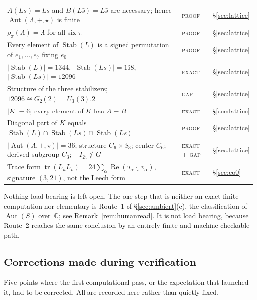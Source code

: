 \documentclass[11pt]{amsart}
\newcommand{\LL}{\Lambda}
\newcommand{\CC}{\mathbb{C}}
\DeclareMathOperator{\Aut}{Aut}
\DeclareMathOperator{\Stab}{Stab}
\DeclareMathOperator{\Tr}{tr}
\DeclareMathOperator{\Rea}{Re}
\theoremstyle{definition}
\theoremstyle{remark}
\begin{document}
\begin{center}
\begin{longtable}{p{}p{}p{}}
$A(Ls) = Ls$ and $B(L\bar s) = L\bar s$ are necessary; hence $\Aut(\LL,+,\star)$ is finite & \textsc{proof} & \S\ref{sec:lattice} \\
$\rho_\pi(\LL) = \LL$ for all six $\pi$ & \textsc{proof} & \S\ref{sec:lattice} \\
Every element of $\Stab(L)$ is a signed permutation of $e_1,\ldots,e_7$ fixing $e_0$ & \textsc{proof} & \S\ref{sec:lattice} \\
$|\Stab(L)| = 1344$, $|\Stab(Ls)| = 168$, $|\Stab(L\bar s)| = 12096$ & \textsc{exact} & \S\ref{sec:lattice} \\
Structure of the three stabilizers; $12096 \cong G_2(2) = U_3(3).2$ & \textsc{gap} & \S\ref{sec:lattice} \\
$|K| = 6$; every element of $K$ has $A = B$ & \textsc{exact} & \S\ref{sec:lattice} \\
Diagonal part of $K$ equals $\Stab(L) \cap \Stab(Ls) \cap \Stab(L\bar s)$ & \textsc{proof} & \S\ref{sec:lattice} \\
$|\Aut(\LL,+,\star)| = 36$; structure $C_6 \times S_3$; center $C_6$; derived subgroup $C_3$; $-I_{24} \notin G$ & \textsc{exact} + \textsc{gap} & \S\ref{sec:lattice} \\
Trace form $\Tr(L_u L_v) = 24 \sum_\alpha \Rea(u_\alpha \cdot_s v_\alpha)$, signature $(3,21)$, not the Leech form & \textsc{exact} & \S\ref{sec:co0} \\
\bottomrule
\end{longtable}
\end{center}

Nothing load bearing is left open. The one step that is neither an exact finite
computation nor elementary is Route~1 of \S\ref{sec:ambient}(c), the
classification of $\Aut(S)$ over~$\CC$; see Remark~\ref{rem:humanread}. It is
not load bearing, because Route~2 reaches the same conclusion by an entirely
finite and machine-checkable path.

\subsection{Corrections made during verification}

Five points where the first computational pass, or the expectation that
launched it, had to be corrected. All are recorded here rather than quietly
fixed.
\end{document}
